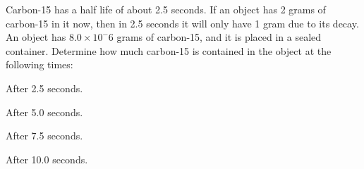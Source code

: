 
\begin{problem}
\item Carbon-15 has a half life of about 2.5 seconds. If an object has
  2 grams of carbon-15 in it now, then in 2.5 seconds it will only
  have 1 gram due to its decay. An object has $8.0\times 10^-{6}$
  grams of carbon-15, and it is placed in a sealed
  container. Determine how much carbon-15 is contained in the object
  at the following times:
  \begin{subproblem}
  \item After 2.5 seconds.
    \vfill
  \item After 5.0 seconds.
    \vfill
  \item After 7.5 seconds.
    \vfill
  \item After 10.0 seconds.
    \vfill
  \end{subproblem}
\end{problem}


